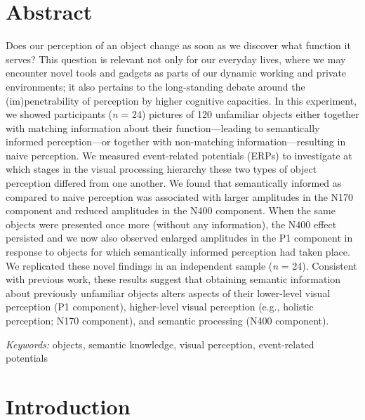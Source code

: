 \documentclass[
  english,
  doc,12pt,twoside,floatsintext]{apa7}
\begin{document}
\begin{flushleft}
{
\tableofcontents
}
\end{flushleft}

\clearpage

\mbox{}\thispagestyle{empty}\clearpage

\setcounter{page}{1}

\hypertarget{abstract}{%
\section*{Abstract}\label{abstract}}

\noindent Does our perception of an object change as soon as we discover what function it serves? This question is relevant not only for our everyday lives, where we may encounter novel tools and gadgets as parts of our dynamic working and private environments; it also pertains to the long-standing debate around the (im)penetrability of perception by higher cognitive capacities. In this experiment, we showed participants (\emph{n} = 24) pictures of 120 unfamiliar objects either together with matching information about their function---leading to semantically informed perception---or together with non-matching information---resulting in naive perception. We measured event-related potentials (ERPs) to investigate at which stages in the visual processing hierarchy these two types of object perception differed from one another. We found that semantically informed as compared to naive perception was associated with larger amplitudes in the N170 component and reduced amplitudes in the N400 component. When the same objects were presented once more (without any information), the N400 effect persisted and we now also observed enlarged amplitudes in the P1 component in response to objects for which semantically informed perception had taken place. We replicated these novel findings in an independent sample (\emph{n} = 24). Consistent with previous work, these results suggest that obtaining semantic information about previously unfamiliar objects alters aspects of their lower-level visual perception (P1 component), higher-level visual perception (e.g., holistic perception; N170 component), and semantic processing (N400 component).

\emph{Keywords:} objects, semantic knowledge, visual perception, event-related potentials

\newpage

\hypertarget{introduction}{%
\section{Introduction}\label{introduction}}
\end{document}
